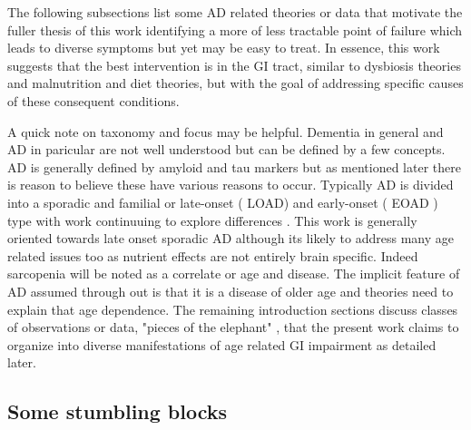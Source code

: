 The following subsections list some AD related theories or data  
that motivate the fuller thesis of this work identifying
a more of less tractable point of failure which leads
to diverse symptoms but yet may be easy to treat. In essence,
this work suggests that the best intervention is in the GI 
tract, similar to dysbiosis theories and malnutrition and diet theories,
but with the goal of addressing specific causes of these consequent
conditions.  

A quick note on taxonomy and focus may be helpful. Dementia in general
and AD in paricular are not well understood but can be defined
by a few concepts. 
AD is generally defined by amyloid and tau markers
\cite{Karagas_Young_Blue_Spectrum_Genetic_2025}
but as mentioned later there is reason to believe these have various
reasons to occur. 
Typically AD is divided into a sporadic and familial  or late-onset ( LOAD)
and  early-onset ( EOAD ) type with work continuuing to explore
differences
\cite{Putcha2025}
\cite{Brickell_Steinbart_Rumbaugh_Early_Onset_Alzheimer_Disease_2006}
\cite{Wu2025}
. 
This work is generally oriented towards late onset sporadic AD
although its likely to address many age related issues too as nutrient 
effects are not entirely brain specific. Indeed sarcopenia
will be noted as a correlate or age and disease.  The implicit
feature of AD assumed through out is that it is a disease of
older age and theories need to explain that age dependence.
The remaining introduction sections discuss classes of observations
or data, "pieces of the elephant" , that the present work 
claims to organize into diverse manifestations of age related
GI impairment as detailed later.

\subsection{ Some stumbling blocks }


